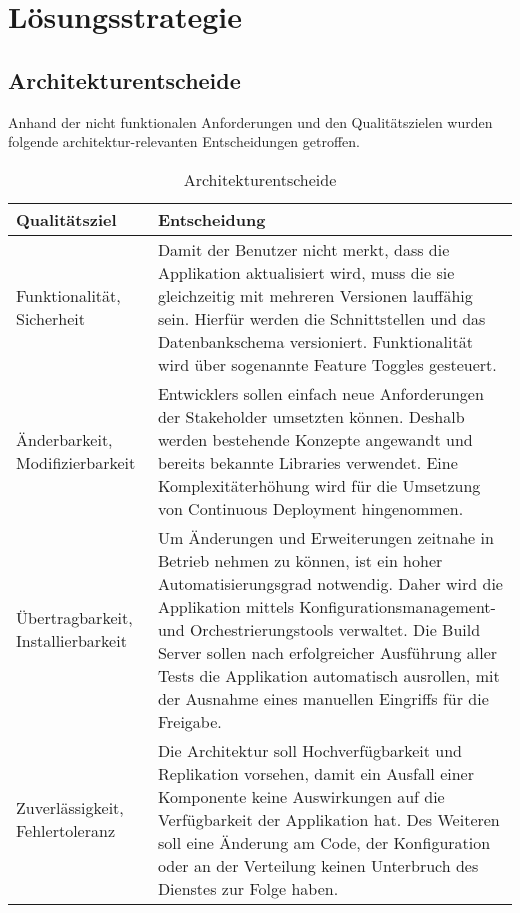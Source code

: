 \chapter{Lösungsstrategie}

\section{Architekturentscheide}

Anhand der nicht funktionalen Anforderungen und den Qualitätszielen wurden folgende architektur-relevanten Entscheidungen getroffen.

\begin{table}[H]
	\centering
	\caption{Architekturentscheide}
	\begin{tabular}{ | p{4cm} | p{11cm} | }
		\toprule
		{\textbf{Qualitätsziel}} & {\textbf{Entscheidung}} \\
		\midrule
		Funktionalität, Sicherheit &  Damit der Benutzer nicht merkt, dass die Applikation aktualisiert wird, muss die sie gleichzeitig mit mehreren Versionen lauffähig sein. Hierfür werden die Schnittstellen und das Datenbankschema versioniert. Funktionalität wird über sogenannte Feature Toggles gesteuert.\\ \hline
		Änderbarkeit, Modifizierbarkeit & Entwicklers sollen einfach neue Anforderungen der Stakeholder umsetzten können. Deshalb werden bestehende Konzepte angewandt und bereits bekannte Libraries verwendet. Eine Komplexitäterhöhung wird für die Umsetzung von Continuous Deployment hingenommen. \\ \hline
		Übertragbarkeit, Installierbarkeit &  Um Änderungen und Erweiterungen zeitnahe in Betrieb nehmen zu können, ist ein hoher Automatisierungsgrad notwendig. Daher wird die Applikation mittels Konfigurationsmanagement- und Orchestrierungstools verwaltet. Die Build Server sollen nach erfolgreicher Ausführung aller Tests die Applikation automatisch ausrollen, mit der Ausnahme eines manuellen Eingriffs für die Freigabe.\\ \hline
		Zuverlässigkeit, Fehlertoleranz &  Die Architektur soll Hochverfügbarkeit und Replikation vorsehen, damit ein Ausfall einer Komponente keine Auswirkungen auf die Verfügbarkeit der Applikation hat. Des Weiteren soll eine Änderung am Code, der Konfiguration oder an der Verteilung keinen Unterbruch des Dienstes zur Folge haben.\\
		\bottomrule
	\end{tabular}
\end{table}

